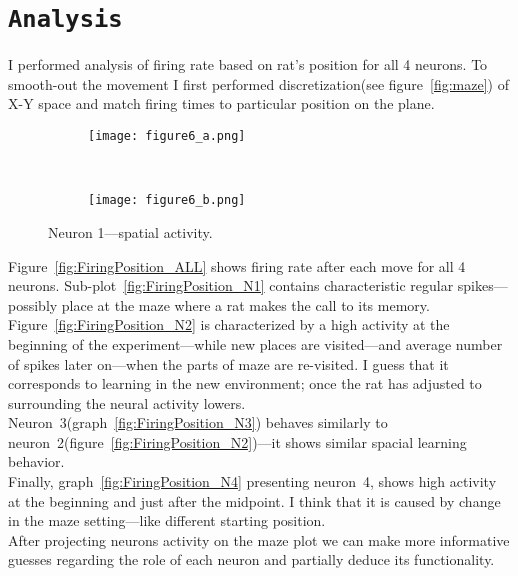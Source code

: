 \documentclass[12pt,a4paper,twocolumn]{article}
\begin{document}
\section*{\texttt{Analysis}}
I performed analysis of firing rate based on rat's position for all 4 neurons. To smooth-out the movement I first performed discretization(see figure~\ref{fig:maze}) of X-Y space and match firing times to particular position on the plane.\\

\begin{figure}[h]
  \begin{subfigure}{.99\linewidth}\centering
    \texttt{[image: figure6\_a.png]}
    \caption{\label{fig:3d_n1_a}}
  \end{subfigure}\\[1ex]
  \begin{subfigure}{.99\linewidth}\centering
    \texttt{[image: figure6\_b.png]}
    \caption{\label{fig:3d_n1_b}}
  \end{subfigure}

  \caption{Neuron 1---spatial activity.\label{fig:3d_n1}}
\end{figure}

Figure~\ref{fig:FiringPosition_ALL} shows firing rate after each move for all 4 neurons. Sub-plot~\ref{fig:FiringPosition_N1} contains characteristic regular spikes---possibly place at the maze where a rat makes the call to its memory.\\
Figure~\ref{fig:FiringPosition_N2} is characterized by a high activity at the beginning of the experiment---while new places are visited---and average number of spikes later on---when the parts of maze are re-visited. I guess that it corresponds to learning in the new environment; once the rat has adjusted to surrounding the neural activity lowers.\\
Neuron~3(graph~\ref{fig:FiringPosition_N3}) behaves similarly to neuron~2(figure~\ref{fig:FiringPosition_N2})---it shows similar spacial learning behavior.\\
Finally, graph~\ref{fig:FiringPosition_N4} presenting neuron~4, shows high activity at the beginning and just after the midpoint. I think that it is caused by change in the maze setting---like different starting position.\\

After projecting neurons activity on the maze plot we can make more informative guesses regarding the role of each neuron and partially deduce its functionality.\\
\end{document}
